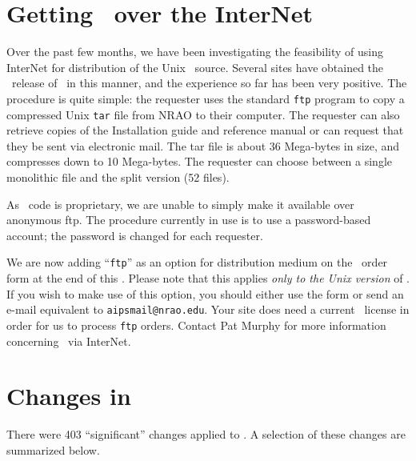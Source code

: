 \section{Getting \AIPS\ over the InterNet}

Over the past few months, we have been investigating the feasibility
of using InterNet for distribution of the Unix \AIPS\ source.  Several
sites have obtained the \JANNO\ release of \AIPS\ in this
manner, and the experience so far has been very positive.  The
procedure is quite simple: the requester uses the standard {\tt ftp}
program to copy a compressed Unix {\tt tar} file from NRAO to their
computer.  The requester can also retrieve copies of the Installation
guide and reference manual or can request that they be sent via
electronic mail.  The tar file is about 36 Mega-bytes in size, and
compresses down to 10 Mega-bytes.  The requester can choose between a
single monolithic file and the split version (52 files).

As \AIPS\ code is proprietary, we are unable to simply make it
available over anonymous ftp.  The procedure currently in use is to
use a password-based account; the password is changed for each
requester.

We are now adding ``{\tt ftp}'' as an option for distribution medium on
the \AIPS\ order form at the end of this {\tt \AIPSLETTER}.  Please note that
this applies {\it only to the Unix version\/} of \AIPS.  If you wish
to make use of this option, you should either use the form or send an
e-mail equivalent to {\tt aipsmail@nrao.edu}.  Your site does need a
current \AIPS\ license in order for us to process {\tt ftp} orders.
Contact Pat Murphy for more information concerning \AIPS\ via InterNet.

\normalstyle
\section{Changes in \RELEASENAME}
There were 403  ``significant'' changes applied to \JANNO.
A selection of these changes are summarized below.
